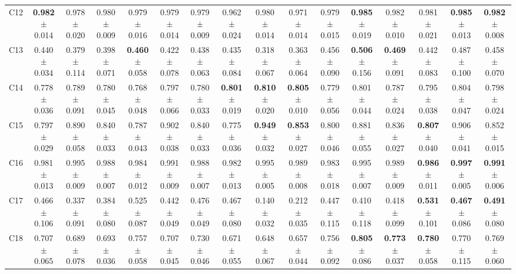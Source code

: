 \begin{table}
{\begin{tabular}{lccccccccccccccc}
C12 & \textbf{0.982} $\pm$ 0.014 & 0.978 $\pm$ 0.020 & 0.980 $\pm$ 0.009 & 0.979 $\pm$ 0.016 & 0.979 $\pm$ 0.014 & 0.979 $\pm$ 0.009 & 0.962 $\pm$ 0.024 & 0.980 $\pm$ 0.014 & 0.971 $\pm$ 0.014 & 0.979 $\pm$ 0.015 & \textbf{0.985} $\pm$ 0.019 & 0.982 $\pm$ 0.010 & 0.981 $\pm$ 0.021 & \textbf{0.985} $\pm$ 0.013 & \textbf{0.982} $\pm$ 0.008 \\
C13 & 0.440 $\pm$ 0.034 & 0.379 $\pm$ 0.114 & 0.398 $\pm$ 0.071 & \textbf{0.460} $\pm$ 0.058 & 0.422 $\pm$ 0.078 & 0.438 $\pm$ 0.063 & 0.435 $\pm$ 0.084 & 0.318 $\pm$ 0.067 & 0.363 $\pm$ 0.064 & 0.456 $\pm$ 0.090 & \textbf{0.506} $\pm$ 0.156 & \textbf{0.469} $\pm$ 0.091 & 0.442 $\pm$ 0.083 & 0.487 $\pm$ 0.100 & 0.458 $\pm$ 0.070 \\
C14 & 0.778 $\pm$ 0.036 & 0.789 $\pm$ 0.091 & 0.780 $\pm$ 0.045 & 0.768 $\pm$ 0.048 & 0.797 $\pm$ 0.066 & 0.780 $\pm$ 0.033 & \textbf{0.801} $\pm$ 0.019 & \textbf{0.810} $\pm$ 0.020 & \textbf{0.805} $\pm$ 0.010 & 0.779 $\pm$ 0.056 & 0.801 $\pm$ 0.044 & 0.787 $\pm$ 0.024 & 0.795 $\pm$ 0.038 & 0.804 $\pm$ 0.047 & 0.798 $\pm$ 0.024 \\
C15 & 0.797 $\pm$ 0.029 & 0.890 $\pm$ 0.058 & 0.840 $\pm$ 0.033 & 0.787 $\pm$ 0.043 & 0.902 $\pm$ 0.038 & 0.840 $\pm$ 0.033 & 0.775 $\pm$ 0.036 & \textbf{0.949} $\pm$ 0.032 & \textbf{0.853} $\pm$ 0.027 & 0.800 $\pm$ 0.046 & 0.881 $\pm$ 0.055 & 0.836 $\pm$ 0.027 & \textbf{0.807} $\pm$ 0.040 & 0.906 $\pm$ 0.041 & 0.852 $\pm$ 0.015 \\
C16 & 0.981 $\pm$ 0.013 & 0.995 $\pm$ 0.009 & 0.988 $\pm$ 0.007 & 0.984 $\pm$ 0.012 & 0.991 $\pm$ 0.009 & 0.988 $\pm$ 0.007 & 0.982 $\pm$ 0.013 & 0.995 $\pm$ 0.005 & 0.989 $\pm$ 0.008 & 0.983 $\pm$ 0.018 & 0.995 $\pm$ 0.007 & 0.989 $\pm$ 0.009 & \textbf{0.986} $\pm$ 0.011 & \textbf{0.997} $\pm$ 0.005 & \textbf{0.991} $\pm$ 0.006 \\
C17 & 0.466 $\pm$ 0.106 & 0.337 $\pm$ 0.091 & 0.384 $\pm$ 0.080 & 0.525 $\pm$ 0.087 & 0.442 $\pm$ 0.049 & 0.476 $\pm$ 0.049 & 0.467 $\pm$ 0.080 & 0.140 $\pm$ 0.032 & 0.212 $\pm$ 0.035 & 0.447 $\pm$ 0.115 & 0.410 $\pm$ 0.118 & 0.418 $\pm$ 0.099 & \textbf{0.531} $\pm$ 0.101 & \textbf{0.467} $\pm$ 0.086 & \textbf{0.491} $\pm$ 0.080 \\
C18 & 0.707 $\pm$ 0.065 & 0.689 $\pm$ 0.078 & 0.693 $\pm$ 0.036 & 0.757 $\pm$ 0.058 & 0.707 $\pm$ 0.045 & 0.730 $\pm$ 0.046 & 0.671 $\pm$ 0.055 & 0.648 $\pm$ 0.067 & 0.657 $\pm$ 0.044 & 0.756 $\pm$ 0.092 & \textbf{0.805} $\pm$ 0.086 & \textbf{0.773} $\pm$ 0.037 & \textbf{0.780} $\pm$ 0.058 & 0.770 $\pm$ 0.115 & 0.769 $\pm$ 0.060 \\

\end{tabular}}
\end{table}
